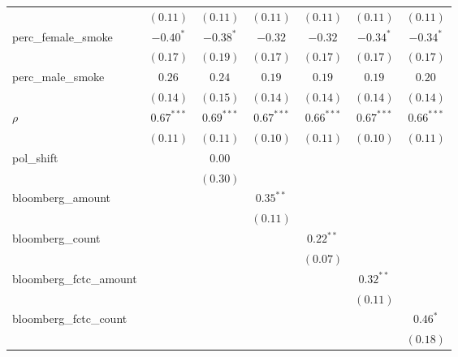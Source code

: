 \begin{table}[!h]
\begin{center}
\begin{tabular}{l c c c c c c }
                        & $(0.11)$     & $(0.11)$     & $(0.11)$     & $(0.11)$     & $(0.11)$     & $(0.11)$     \\
perc\_female\_smoke     & $-0.40^{*}$  & $-0.38^{*}$  & $-0.32$      & $-0.32$      & $-0.34^{*}$  & $-0.34^{*}$  \\
                        & $(0.17)$     & $(0.19)$     & $(0.17)$     & $(0.17)$     & $(0.17)$     & $(0.17)$     \\
perc\_male\_smoke       & $0.26$       & $0.24$       & $0.19$       & $0.19$       & $0.19$       & $0.20$       \\
                        & $(0.14)$     & $(0.15)$     & $(0.14)$     & $(0.14)$     & $(0.14)$     & $(0.14)$     \\
$\rho$                  & $0.67^{***}$ & $0.69^{***}$ & $0.67^{***}$ & $0.66^{***}$ & $0.67^{***}$ & $0.66^{***}$ \\
                        & $(0.11)$     & $(0.11)$     & $(0.10)$     & $(0.11)$     & $(0.10)$     & $(0.11)$     \\
pol\_shift              &              & $0.00$       &              &              &              &              \\
                        &              & $(0.30)$     &              &              &              &              \\
bloomberg\_amount       &              &              & $0.35^{**}$  &              &              &              \\
                        &              &              & $(0.11)$     &              &              &              \\
bloomberg\_count        &              &              &              & $0.22^{**}$  &              &              \\
                        &              &              &              & $(0.07)$     &              &              \\
bloomberg\_fctc\_amount &              &              &              &              & $0.32^{**}$  &              \\
                        &              &              &              &              & $(0.11)$     &              \\
bloomberg\_fctc\_count  &              &              &              &              &              & $0.46^{*}$   \\
                        &              &              &              &              &              & $(0.18)$     \\

\end{tabular}
\end{center}
\end{table}
